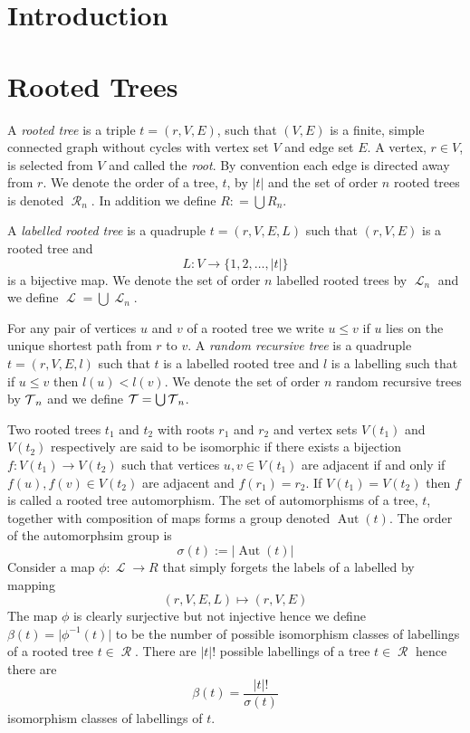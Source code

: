
\DeclareMathOperator{\F}{\mathcal{F}}
\DeclareMathOperator{\R}{\mathcal{R}}
\DeclareMathOperator{\La}{\mathcal{L}}
\DeclareMathOperator{\V}{\mathcal{V}}
\DeclareMathOperator{\Aut}{Aut}
\usepackage{amssymb}

\section{Introduction}

\section{Rooted Trees}
 A \emph{rooted tree} is a triple $t = (r,V,E)$, such that $(V,E)$ is a finite, simple connected graph without cycles with 
 vertex set $V$ and edge set $E$. A vertex, $r \in V$, is selected from $V$ and called the \emph{root}. By convention each edge is directed away from $r$.  We denote the
 order of a tree, $t$, by $\lvert t \rvert$ and the set of order $n$ rooted trees is denoted $\R_n$.  In addition we define 
 $R : = \bigcup R_n$.
 
 A \emph{labelled rooted tree} is a quadruple $t = (r,V,E,L)$ such that $(r,V,E)$ is a rooted tree and 
 \[L: V \longrightarrow \{1,2,\dots,\lvert t \rvert\}\] 
is a bijective map.  We denote the set of order $n$ labelled rooted trees by $\La_n$ and we define $\La = \bigcup \La_n$.      

For any pair of vertices $u$ and $v$ of a rooted tree we write $u \leq v$ if $u$ lies on the unique shortest path from $r$ to $v$.  A 
\emph{random recursive tree} is a quadruple $t = (r,V,E,l)$ such that $t$ is a labelled rooted tree and $l$ is a labelling 
such that if $u \leq v$ then $l(u) < l(v)$. 
We denote the set of order $n$ random recursive trees by $\operatorname{\mathcal{T}}_n$ and we define $\operatorname{\mathcal{T}} = \bigcup \operatorname{\mathcal{T}}_n$. 


Two rooted trees $t_1$ and $t_2$ with roots $r_1$ and $r_2$ and vertex sets $V(t_1)$ and $V(t_2)$ respectively are said to be
isomorphic if there exists a bijection $f: V(t_1) \rightarrow V(t_2)$ such that 
vertices $u,v \in V(t_1)$ are adjacent if and only if $f(u),f(v) \in V(t_2)$ are adjacent and $f(r_1) = r_2$. If 
$V(t_1) = V(t_2)$ then $f$ is called a rooted tree automorphism.  The set of automorphisms of a tree, $t$, together with 
composition of maps forms a group denoted $\Aut(t)$.  The order of the automorphsim group is 
\[\sigma(t) := \lvert \Aut(t) \rvert\] 
Consider a map $\phi: \La \rightarrow R$ that simply forgets the labels of a labelled by mapping
\[
 (r,V,E,L) \mapsto (r,V,E)
\]
The map $\phi$ is clearly surjective but not injective hence we define $\beta(t) = \lvert \phi^{-1}(t) \rvert$ to be the number of
possible isomorphism classes of labellings of a rooted tree $t \in \R$. There are $\lvert t \rvert !$ possible labellings of a tree 
$t \in \R$ hence there are  
\begin{equation}\label{eq:1}
  \beta(t) = \frac{\lvert t \rvert !}{\sigma(t)} 
\end{equation}
isomorphism classes of labellings of $t$.  

